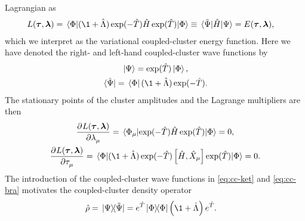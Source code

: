             Lagrangian as
            \begin{align}
                L(\vfg{\clustamp}, \vfg{\clustlamp})
                &= \mel*{\slat}{
                    (\1 + \clustl)
                    \exponential(-\clust)
                    \hamil
                    \exponential(\clust)
                }{\slat}
                \equiv \mel*{\tilde{\Psi}}{\hamil}{\Psi}
                = E(\vfg{\clustamp}, \vfg{\clustlamp}),
                \label{eq:cc-energy-functional}
            \end{align}
            which we interpret as the variational coupled-cluster energy
            function.
            Here we have denoted the right- and left-hand coupled-cluster wave
            functions by
            \begin{gather}
                \ket*{\Psi} = \exponential(\clust)\ket*{\slat},
                \label{eq:cc-ket}
                \\
                \bra*{\tilde{\Psi}} = \bra*{\slat}(\1 + \clustl)
                \exponential(-\clust).
                \label{eq:cc-bra}
            \end{gather}
            The stationary points of the cluster amplitudes and the Lagrange
            multipliers are then
            \begin{gather}
                \dpd[]{L(\vfg{\clustamp}, \vfg{\clustlamp})}
                {\clustlamp_{\mu}}
                = \mel*{\slat_{\mu}}{
                    \exponential(-\clust)
                    \hamil
                    \exponential(\clust)
                }{\slat}
                = 0,
                \label{eq:cc-lagrangian-tau}
                \\
                \dpd[]{L(\vfg{\clustamp}, \vfg{\clustlamp})}
                {\clustamp_{\mu}}
                = \mel*{\slat}{
                    (\1 + \clustl)
                    \exponential(-\clust)
                    \com{\hamil}{\hat{X}_{\mu}}
                    \exponential(\clust)
                }{\slat}
                \label{eq:cc-lagrangian-lambda}
                = 0.
            \end{gather}
            The introduction of the coupled-cluster wave functions in
            \autoref{eq:cc-ket} and \autoref{eq:cc-bra} motivates the
            coupled-cluster density operator \cite{kvaal2013variational}
            \begin{align}
                \density
                &= \dyad*{\Psi}{\tilde{\Psi}}
                = e^{\clust}\dyad{\slat}{\slat}\para{\1 + \clustl}e^{\clust}.
                \label{eq:cc-density-operator}
            \end{align}
